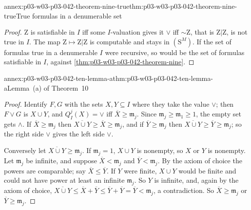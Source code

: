 \begin{annexitem}{annex:p03-w03-p03-042-theorem-nine-true}{thm:p03-w03-p03-042-theorem-nine-true}{True formulas in a denumerable set}
\begin{proof}
\(\mathrm Z\) is satisfiable in \(I\) iff some \(I\)-valuation gives it
\(\vee\) iff \({\sim}\mathrm Z\), that is \(\mathrm Z|\mathrm Z\), is not
true in \(I\).  The map \(\mathrm Z\mapsto\mathrm Z|\mathrm Z\) is
computable and stays in \((\mathrm S^M)\).  If the set of formulas true in
a denumerable \(I\) were recursive, so would be the set of formulas
satisfiable in \(I\), against \cref{thm:p03-w03-p03-042-theorem-nine}.
\end{proof}
\end{annexitem}

\begin{annexitem}{annex:p03-w03-p03-042-ten-lemma-a}{thm:p03-w03-p03-042-ten-lemma-a}{Lemma~(a) of Theorem~10}
\begin{proof}
Identify \(F,G\) with the sets \(X,Y\subseteq I\) where they take the
value \(\vee\); then \(F\vee G\) is \(X\cup Y\), and \(Q^j_I(X)=\vee\) iff
\(\overline X\geq\mathfrak m_j\).  Since \(\mathfrak m_j\geq\mathfrak
m_1\geq1\), the empty set gets \(\wedge\).  If \(\overline X\geq
\mathfrak m_j\) then \(\overline{X\cup Y}\geq\overline X\geq\mathfrak
m_j\), and if \(\overline Y\geq\mathfrak m_j\) then \(\overline{X\cup
Y}\geq\overline Y\geq\mathfrak m_j\); so the right side \(\vee\) gives the left
side \(\vee\).

Conversely let \(\overline{X\cup Y}\geq\mathfrak m_j\).  If \(\mathfrak
m_j=1\), \(X\cup Y\) is nonempty, so \(X\) or \(Y\) is nonempty.  Let
\(\mathfrak m_j\) be infinite, and suppose \(\overline X<\mathfrak m_j\)
and \(\overline Y<\mathfrak m_j\).  By the axiom of choice the powers are
comparable; say \(\overline X\leq\overline Y\).  If \(Y\) were finite,
\(X\cup Y\) would be finite and could not have power at least an infinite
\(\mathfrak m_j\).  So \(Y\) is infinite, and, again by the axiom of
choice, \(\overline{X\cup Y}\leq\overline X+\overline Y\leq\overline Y+
\overline Y=\overline Y<\mathfrak m_j\), a contradiction.  So \(\overline
X\geq\mathfrak m_j\) or \(\overline Y\geq\mathfrak m_j\).
\end{proof}
\end{annexitem}

